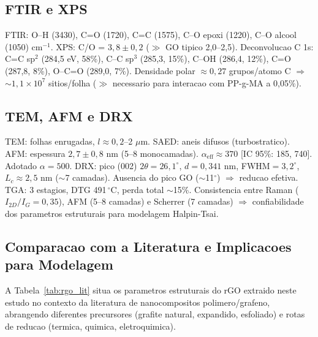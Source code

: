 \documentclass[11pt,a4paper,oneside]{article}
\begin{document}
\subsection{FTIR e XPS}

FTIR: O--H (3430), C=O (1720), C=C (1575), C--O epoxi (1220), C--O alcool (1050) cm$^{-1}$. XPS: C/O = $3{,}8{\pm}0{,}2$ (${\gg}$ GO tipico 2,0--2,5). Deconvolucao C 1s: C=C sp$^2$ (284,5 eV, 58\%), C--C sp$^3$ (285,3, 15\%), C--OH (286,4, 12\%), C=O (287,8, 8\%), O--C=O (289,0, 7\%). Densidade polar ${\approx}0{,}27$ grupos/atomo C $\Rightarrow$ ${\sim}1{,}1{\times}10^7$ sitios/folha (${\gg}$ necessario para interacao com PP-g-MA a 0,05\%).

\subsection{TEM, AFM e DRX}

TEM: folhas enrugadas, $l{\approx}0{,}2$--2 $\mu$m. SAED: aneis difusos (turbostratico). AFM: espessura $2{,}7{\pm}0{,}8$ nm (5--8 monocamadas). $\alpha_{\text{eff}}{\approx}370$ [IC 95\%: 185, 740]. Adotado $\alpha{=}500$. DRX: pico (002) $2\theta{=}26{,}1^{\circ}$, $d{=}0{,}341$ nm, FWHM${=}3{,}2^{\circ}$, $L_c{\approx}2{,}5$ nm (${\sim}$7 camadas). Ausencia do pico GO (${\sim}$11$^{\circ}$) $\Rightarrow$ reducao efetiva. TGA: 3 estagios, DTG 491\,$^{\circ}$C, perda total ${\sim}$15\%. Consistencia entre Raman ($I_{2D}/I_G{=}0{,}35$), AFM (5--8 camadas) e Scherrer (7 camadas) $\Rightarrow$ confiabilidade dos parametros estruturais para modelagem Halpin-Tsai.

\subsection{Comparacao com a Literatura e Implicacoes para Modelagem}

A Tabela~\ref{tab:rgo_lit} situa os parametros estruturais do rGO extraido neste estudo no contexto da literatura de nanocompositos polimero/grafeno, abrangendo diferentes precursores (grafite natural, expandido, esfoliado) e rotas de reducao (termica, quimica, eletroquimica).
\end{document}
